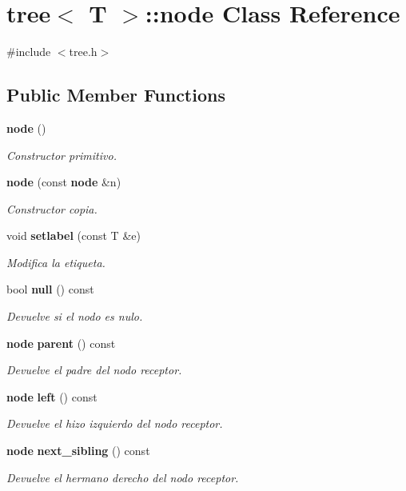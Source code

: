\section{tree$<$ T $>$\+:\+:node Class Reference}
\label{classtree_1_1node}


{\ttfamily \#include $<$tree.\+h$>$}

\subsection*{Public Member Functions}
\begin{DoxyCompactItemize}
\item 
{\bf node} ()
\begin{DoxyCompactList}\small\item\em Constructor primitivo. \end{DoxyCompactList}\item 
{\bf node} (const {\bf node} \&n)
\begin{DoxyCompactList}\small\item\em Constructor copia. \end{DoxyCompactList}\item 
void {\bf setlabel} (const T \&e)
\begin{DoxyCompactList}\small\item\em Modifica la etiqueta. \end{DoxyCompactList}\item 
bool {\bf null} () const 
\begin{DoxyCompactList}\small\item\em Devuelve si el nodo es nulo. \end{DoxyCompactList}\item 
{\bf node} {\bf parent} () const 
\begin{DoxyCompactList}\small\item\em Devuelve el padre del nodo receptor. \end{DoxyCompactList}\item 
{\bf node} {\bf left} () const 
\begin{DoxyCompactList}\small\item\em Devuelve el hizo izquierdo del nodo receptor. \end{DoxyCompactList}\item 
{\bf node} {\bf next\+\_\+sibling} () const 
\begin{DoxyCompactList}\small\item\em Devuelve el hermano derecho del nodo receptor. \end{DoxyCompactList}\item 

\end{DoxyCompactItemize}
